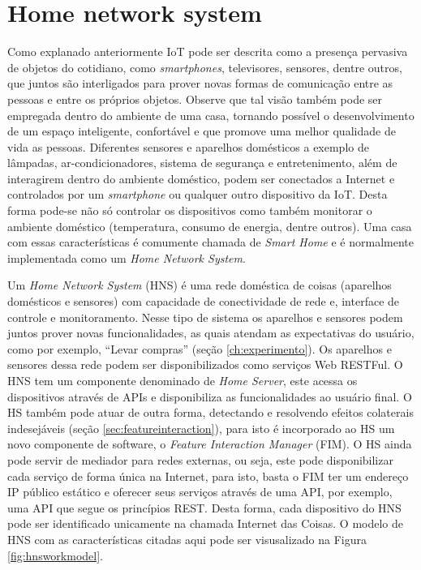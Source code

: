 \section{Home network system}
\label{sec:hns}
Como explanado anteriormente IoT pode ser descrita como a presença pervasiva de objetos do cotidiano, como \textit{smartphones}, televisores, sensores, dentre outros, que juntos são interligados para prover novas formas de comunicação entre as pessoas e entre os próprios objetos. Observe que tal visão também pode ser empregada dentro do ambiente de uma casa, tornando possível o desenvolvimento de um espaço inteligente, confortável e que promove uma melhor qualidade de vida as pessoas. Diferentes sensores e aparelhos domésticos a exemplo de lâmpadas, ar-condicionadores, sistema de segurança e entretenimento, além de interagirem dentro do ambiente doméstico, podem ser conectados a Internet e controlados por um \textit{smartphone} ou qualquer outro dispositivo da IoT. Desta forma pode-se não só controlar os dispositivos como também monitorar o ambiente doméstico (temperatura, consumo de energia, dentre outros). Uma casa com essas características é comumente chamada de \textit{Smart Home} e é normalmente implementada como um \textit{Home Network System}.\cite{Piyare:2013}

Um \textit{Home Network System} (HNS) é uma rede doméstica de coisas (aparelhos domésticos e sensores) com capacidade de conectividade de rede e, interface de controle e monitoramento. Nesse tipo de sistema os aparelhos e sensores podem juntos prover novas funcionalidades, as quais atendam as expectativas do usuário, como por exemplo, ``Levar compras'' (seção \ref{ch:experimento}). Os aparelhos e sensores dessa rede podem ser disponibilizados como serviços Web RESTFul. O HNS tem um componente denominado de \textit{Home Server}, este acessa os dispositivos através de APIs e disponibiliza as funcionalidades ao usuário final. O HS também pode atuar de outra forma, detectando e resolvendo efeitos colaterais indesejáveis (seção \ref{sec:featureinteraction}), para isto é incorporado ao HS um novo componente de software, o \textit{Feature Interaction Manager} (FIM). O HS ainda pode servir de mediador para redes externas, ou seja, este pode disponibilizar cada serviço de forma única na Internet, para isto, basta o FIM ter um endereço IP público estático e oferecer seus serviços através de uma API, por exemplo, uma API que segue os princípios REST. Desta forma, cada dispositivo do HNS pode ser identificado unicamente na chamada Internet das Coisas.\cite{Nakamura:2009}\cite{Ikegami:2013} O modelo de HNS com as características citadas aqui pode ser visusalizado na Figura \ref{fig:hnsworkmodel}.

